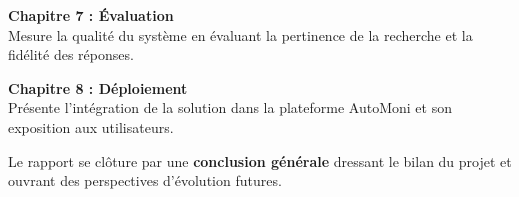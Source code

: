 \vspace{0.2cm}

\noindent\textbf{\color{primaryblue}Chapitre 7 : Évaluation}\\
Mesure la qualité du système en évaluant la pertinence de la recherche et la fidélité des réponses.

\vspace{0.2cm}

\noindent\textbf{\color{primaryblue}Chapitre 8 : Déploiement}\\
Présente l'intégration de la solution dans la plateforme AutoMoni et son exposition aux utilisateurs.

\vspace{0.3cm}

\noindent
Le rapport se clôture par une \textbf{conclusion générale} dressant le bilan du projet et
ouvrant des perspectives d'évolution futures.
